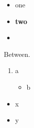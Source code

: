\begin{itemize}
\item one
\item \textbf{two}
\item
\end{itemize}

Between.

\begin{enumerate}
  \item a
  \begin{itemize}
    \item b
  \end{itemize}
\end{enumerate}
\begin{itemize}\item x \item y\end{itemize}
